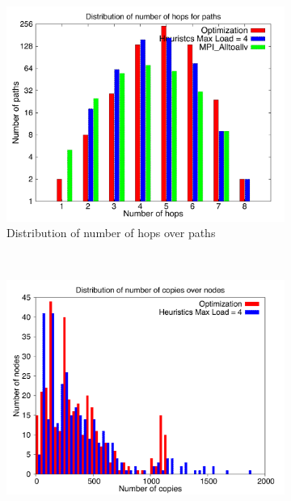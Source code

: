\begin{figure}[!htbp]
        \centering
        \begin{subfigure}[b]{0.49\textwidth}
                \includegraphics[width=\textwidth]{report_figures/constantr/27_512/hop_histo.pdf}
                \caption{Distribution of number of hops over paths}
                \label{fig:27_512_hop}
        \end{subfigure}%
        ~ %
        \begin{subfigure}[b]{0.49\textwidth}
                \includegraphics[width=\textwidth]{report_figures/constantr/27_512/copy_histo.pdf}

\end{subfigure}
\end{figure}
